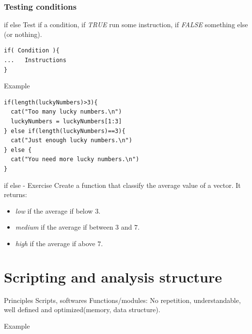\documentclass[10pt]{beamer}
\newenvironment{xframe}[2][]
  {\begin{frame}[fragile,environment=xframe,#1]
  \frametitle{#2}}
  {\end{frame}}
\begin{document}


\begin{xframe}{Testing conditions}
  \begin{block}{{\sf if else}}
    Test if a condition, if {\it TRUE} run some instruction, if {\it FALSE} something else (or nothing).
\begin{verbatim}
if( Condition ){
...   Instructions
} 
\end{verbatim}  
  \end{block}
  \begin{exampleblock}{Example}
\begin{verbatim}
if(length(luckyNumbers)>3){
  cat("Too many lucky numbers.\n")
  luckyNumbers = luckyNumbers[1:3]
} else if(length(luckyNumbers)==3){
  cat("Just enough lucky numbers.\n")
} else {
  cat("You need more lucky numbers.\n")
}
\end{verbatim}  
  \end{exampleblock}
\end{xframe}


\begin{frame}{{\sf if else} - Exercise}
  Create a function that classify the average value of a {\sf vector}. It returns:
  \begin{itemize}
  \item {\it low} if the average if below $3$.
  \item {\it medium} if the average if between $3$ and $7$.
  \item {\it high} if the average if above $7$.
  \end{itemize}
\end{frame}


\section{Scripting and analysis structure}

\begin{frame}{Principles}
  Scripts, softwares
  Functions/modules: No repetition, understandable, well defined and optimized(memory, data structure).
\end{frame}

\begin{frame}{Example}
  
\end{frame}
\end{document}
